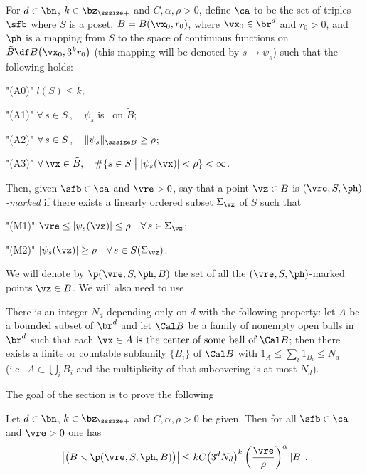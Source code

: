 For $d\in \bn$, $k\in \bz_{\sssize +}$ and $C,\alpha,\rho   > 0$, define $\ca$ to be the set of triples $\sfb$ where $S$ is a poset,  $B = B(\vx_0,r_0)$, where $\vx_0\in\br^d$ and $r_0 > 0$,  and $\ph$ is a mapping from $S$ to the space of continuous functions on $\tilde B \df B\big(\vx_0,3^kr_0\big)$ (this mapping will be denoted by $s\to \psi_s$) such that the following holds:

\roster
\item"(A0)" $l(S) \le k$;


\item"(A1)" $\forall\,s\in S\,,\quad \psi_s$ is \cag\ on $\tilde B$;

\item"(A2)" $\forall\,s\in S\,,\quad\|\psi_s\|_{\sssize B} \ge \rho $;

\item"(A3)"  $\forall\,\vx\in \tilde B,\quad\#\{s\in S\bigm| |\psi_s(\vx)| < \rho\} < \infty$.
\endroster


Then, given $\sfb\in\ca$ and $\vre > 0$, say that a point $\vz\in B$ is {\it $(\vre,S,\ph)$-marked\/} if there exists a linearly ordered subset $\Sigma_\vz$ of $S$ such that

\roster
\item"(M1)" $\vre\le |\psi_s(\vz)| \le \rho \quad \forall\,s\in\Sigma_\vz$;

\item"(M2)" $|\psi_s(\vz)| \ge \rho \quad\forall\,s\in S(\Sigma_\vz)$.
\endroster

We will denote by $\p(\vre,S,\ph,B)$ the set of all the $(\vre,S,\ph)$-marked points $\vz\in B$. 
We will also need to use

   There is an integer $N_d$ depending only on $d$ with the following property: let  $A$ be a bounded subset of $\br^d$ and let $\Cal B$ be a family  of nonempty open balls in $\br^d$ such that each $\vx\in A \text{ is the center of some ball of }\Cal B$; 
then there exists a finite or countable subfamily $\{B_i\}$ of $\Cal B$ with $
1_A \le \sum_i 1_{B_i} \le N_{d}
$ (i.e.~$A\subset \bigcup_i B_i$ and the multiplicity of that
subcovering is at most $N_{d}$). 
\endproclaim

The goal of the section is to prove the following


 
  Let $d\in \bn$, $k\in \bz_{\sssize +}$ and $C,\alpha,\rho  > 0$ be given. Then  for all $\sfb\in\ca$ and $ \vre >0$ one has
$$
\left|\big(B\smallsetminus \p(\vre,S,\ph,B)\big)\right| \le kC\big(3^dN_d\big)^k \left(\frac\vre \rho \right)^\alpha  |B|\,.
$$
\endproclaim
 

